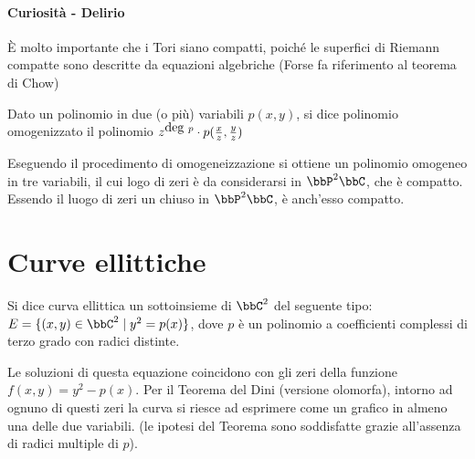 \paragraph{Curiosità - Delirio}
È molto importante che i Tori siano compatti, poiché le superfici di Riemann compatte sono descritte da equazioni algebriche (Forse fa riferimento al teorema di Chow)

\begin{definizione}
  Dato un polinomio in due (o più) variabili $p(x,y)$, si dice polinomio omogenizzato il polinomio $z^{\mbox{deg } p} \cdot p(\frac{x}{z}, \frac{y}{z})$
\end{definizione}

\begin{osservazione}
  Eseguendo il procedimento di omogeneizzazione si ottiene un polinomio omogeneo in tre variabili, il cui logo di zeri è da considerarsi in $\bbP^2 \bbC$, che è compatto. Essendo il luogo di zeri un chiuso in $\bbP^2 \bbC$, è anch'esso compatto.
\end{osservazione}

\section{Curve ellittiche}
\begin{definizione}
  Si dice curva ellittica un sottoinsieme di $\bbC^2$ del seguente tipo: $E = \{ (x,y) \in \bbC^2 \mid y^2 = p(x) \}$, dove $p$ è un polinomio a coefficienti complessi di terzo grado con radici distinte.
\end{definizione}



Le soluzioni di questa equazione coincidono con gli zeri della funzione $f(x,y) = y^2 - p(x)$.  Per il Teorema del Dini (versione olomorfa), intorno ad ognuno di questi zeri la curva si riesce ad esprimere come un grafico in almeno una delle due variabili.  (le ipotesi del Teorema sono soddisfatte grazie all'assenza di radici multiple di $p$).

